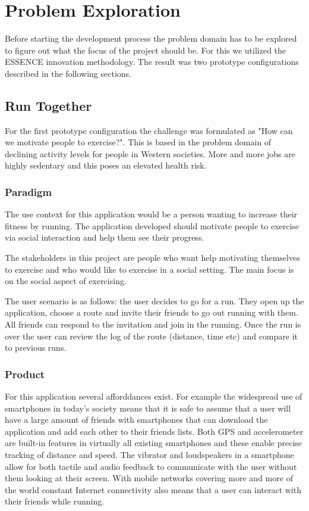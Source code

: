 \section{Problem Exploration}
\label{sec:problem-exp}
Before starting the development process the problem domain has to be explored to figure out what the focus of the project should be. For this we utilized the ESSENCE innovation methodology. The result was two prototype configurations described in the following sections.

\subsection{Run Together}
For the first prototype configuration the challenge was formulated as "How can we motivate people to exercise?". This is based in the problem domain of declining activity levels for people in Western societies. More and more jobs are highly sedentary and this poses an elevated health risk. 
\vspace{10pt}

\subsubsection{Paradigm}
The use context for this application would be a person wanting to increase their fitness by running. The application developed should motivate people to exercise via social interaction and help them see their progress.
\vspace{10pt}

The stakeholders in this project are people who want help motivating themselves to exercise and who would like to exercise in a social setting. The main focus is on the social aspect of exercising. 
\vspace{10pt}

The user scenario is as follows: the user decides to go for a run. They open up the application, choose a route and invite their friends to go out running with them. All friends can respond to the invitation and join in the running. Once the run is over the user can review the log of the route (distance, time etc) and compare it to previous runs.  

\subsubsection{Product}
For this application several afforddances exist. For example the widespread use of smartphones in today's society means that it is safe to assume that a user will have a large amount of friends with smartphones that can download the application and add each other to their friends lists. Both \ac{GPS} and accelerometer are built-in features in virtually all existing smartphones and these enable precise tracking of distance and speed. The vibrator and loudspeakers in a smartphone allow for both tactile and audio feedback to communicate with the user without them looking at their screen. With mobile networks covering more and more of the world constant Internet connectivity also means that a user can interact with their friends while running.
\vspace{10pt}

